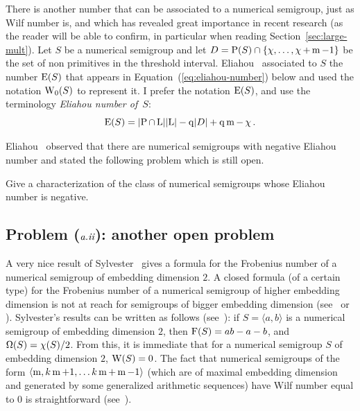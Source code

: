 There is another number that can be associated to a numerical semigroup, just as Wilf number is, and which has revealed great importance in recent research (as the reader will be able to confirm, in particular when reading Section~\ref{sec:large-mult}).
Let $S$ be a numerical semigroup and let $D= \operatorname{P}(S)\cap \{\operatorname{\chi},\dots,\operatorname{\chi}+\operatorname{m}-1\}$ be the set of non primitives in the threshold interval.
Eliahou~\cite{Eliahou2018JEMS-Wilfs} associated to $S$ the number $\operatorname{E}(S)$ that appears in Equation~(\ref{eq:eliahou-number}) below and used the notation $\operatorname{W}_0(S)$ to represent it. I prefer the notation $\operatorname{E}(S)$, and use the terminology \emph{Eliahou number of~$S$}:
\begin{equation}\label{eq:eliahou-number}
\operatorname{E}(S) = \lvert \operatorname{P}\cap \operatorname{L}\rvert\lvert \operatorname{L} \rvert - {\operatorname{q}} \lvert D\rvert + \operatorname{q}\operatorname{m} - \operatorname{\chi}.
\end{equation}

Eliahou~\cite[Pg.~2112]{Eliahou2018JEMS-Wilfs} observed that there are numerical semigroups with negative Eliahou number and stated the following problem which is still open.
\begin{problem}
	Give a characterization of the class of numerical semigroups whose Eliahou number is negative.
\end{problem}

\subsection{Problem ($\emph{a.ii}$): another open problem}\label{sec:wilf-a2}
A very nice result of Sylvester~\cite{Sylvester1984ET-Mathematical} gives a formula for the Frobenius number of a numerical semigroup of embedding dimension $2$. A closed formula (of a certain type) for the Frobenius number of a numerical semigroup of higher embedding dimension is not at reach for semigroups of bigger embedding dimension (see~\cite{Curtis1990MS-formulas} or \cite[Cor. 2.2.2]{Ramirez-Alfonsin2005Book-Diophantine}). Sylvester's results can be written as follows (see~\cite{RosalesGarcia2009Book-Numerical}): if $S = \langle a, b\rangle$ is a numerical semigroup of embedding dimension $2$, then  $\operatorname{F}(S) = ab-a-b$, and $\operatorname{\Omega}(S)=\operatorname{\chi}(S)/2$. From this, it is immediate that for a numerical semigroup $S$ of embedding dimension $2$, $\operatorname{W}(S)=0$.
The fact that numerical semigroups of the form $\langle \operatorname{m}, k\operatorname{m}+1,\ldots k\operatorname{m}+\operatorname{m}-1\rangle$ (which are of maximal embedding dimension and generated by some generalized arithmetic sequences) have Wilf number equal to $0$ is straightforward (see~\cite{FroebergGottliebHaeggkvist1987SF-numerical,MoscarielloSammartano2015MZ-conjecture}). 

